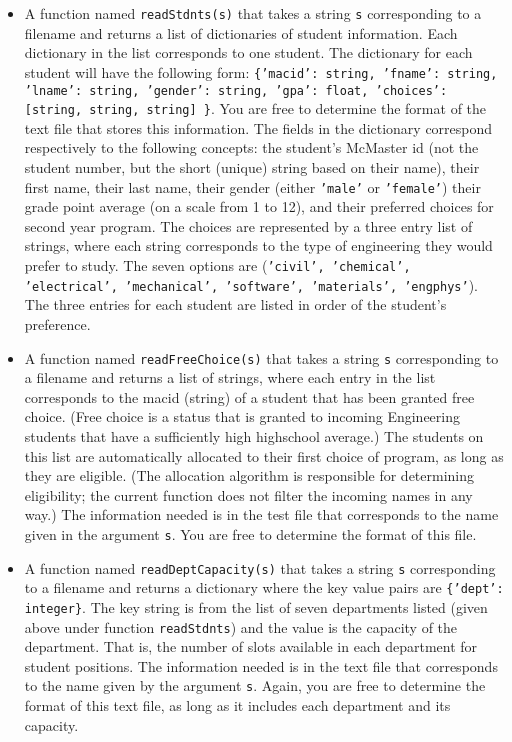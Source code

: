 \documentclass[12pt]{article}
\begin{document}
\begin{itemize}
\item A function named \texttt{readStdnts(s)} that takes a string \texttt{s}
  corresponding to a filename and returns a list of dictionaries of student
  information.  Each dictionary in the list corresponds to one student.  The
  dictionary for each student will have the following form: \texttt{\{'macid':
    string, 'fname': string, 'lname': string, 'gender': string, 'gpa': float,
    'choices': [string, string, string] \}}.  You are free to determine the
  format of the text file that stores this information.  The fields in the
  dictionary correspond respectively to the following concepts: the student's
  McMaster id (not the student number, but the short (unique) string based on
  their name), their first name, their last name, their gender (either
  \texttt{'male'} or \texttt{'female'}) their grade point average (on a scale
  from 1 to 12), and their preferred choices for second year program.  The
  choices are represented by a three entry list of strings, where each string
  corresponds to the type of engineering they would prefer to study.  The seven
  options are (\texttt{'civil', 'chemical', 'electrical', 'mechanical',
    'software', 'materials', 'engphys'}).  The three entries for each student
  are listed in order of the student's preference.

\item A function named {\tt readFreeChoice(s)} that takes a string \texttt{s}
  corresponding to a filename and returns a list of strings, where each entry in
  the list corresponds to the macid (string) of a student that has been granted
  free choice.  (Free choice is a status that is granted to incoming Engineering
  students that have a sufficiently high highschool average.)  The students on
  this list are automatically allocated to their first choice of program, as
  long as they are eligible.  (The allocation algorithm is responsible for
  determining eligibility; the current function does not filter the incoming
  names in any way.)  The information needed is in the test file that
  corresponds to the name given in the argument \texttt{s}.  You are free to
  determine the format of this file.

\item A function named {\tt readDeptCapacity(s)} that takes a string \texttt{s}
  corresponding to a filename and returns a dictionary where the key value pairs
  are \texttt{\{'dept': integer\}}.  The key string is from the list of seven
  departments listed (given above under function \texttt{readStdnts}) and the
  value is the capacity of the department.  That is, the number of slots
  available in each department for student positions.  The information needed is
  in the text file that corresponds to the name given by the argument \texttt{s}.
  Again, you are free to determine the format of this text file, as long as it
  includes each department and its capacity.

\end{itemize}
\end{document}
